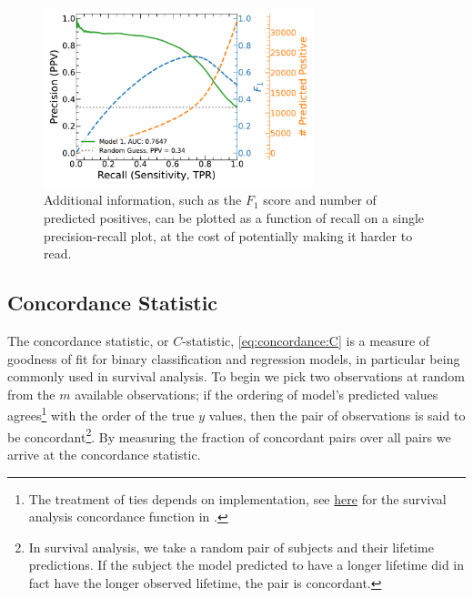 \begin{figure}
  \centering
  \includegraphics[width=0.7\textwidth,trim={0.18cm 0.3cm 0.18cm 0.3cm}]{figures/ml/roc_curves/roc_precision_recall_model_1_f1_n_pos}%
\caption{
Additional information, such as the $F_{1}$ score and number of predicted positives,
can be plotted as a function of recall on a single precision-recall plot,
at the cost of potentially making it harder to read.
}
\label{fig:ml:roc:precision_recall:extended}
\end{figure}

\subsection{Concordance Statistic}
\label{ml_general:eval:concordance}

The concordance statistic, or $C$-statistic, \cref{eq:concordance:C} is a measure of goodness of fit
for binary classification and regression models, in particular being commonly used in survival analysis.
To begin we pick two observations at random from the $m$ available observations;
if the ordering of model's predicted \yhat values agrees\footnote{The treatment of ties depends on implementation,
see \href{https://cran.r-project.org/web/packages/survival/vignettes/concordance.pdf}{here}
for the survival analysis concordance function in \R.} with the order of the true $y$ values,
then the pair of observations is said to be concordant\footnote{In survival analysis,
we take a random pair of subjects and their lifetime predictions.
If the subject the model predicted to have a longer lifetime
did in fact have the longer observed lifetime, the pair is concordant.}.
By measuring the fraction of concordant pairs over all pairs we arrive at the concordance statistic.

